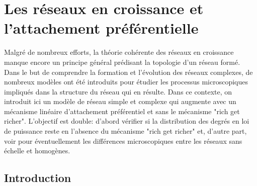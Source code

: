 \newcommand{\kms}{\textless k_s(t) \textgreater}
\newcommand{\kmss}{\textless k_s^2(t) \textgreater}

\chapter{Les réseaux en croissance et l'attachement préférentielle}

Malgré de nombreux efforts, la théorie cohérente des réseaux en croissance manque encore un principe général prédisant la topologie d'un réseau formé. Dans le but de comprendre la formation et l'évolution des réseaux complexes, de nombreux modèles ont été introduits pour étudier les processus microscopiques impliqués dans la structure du réseau qui en résulte. Dans ce contexte, on introduit ici un modèle de réseau simple et complexe qui augmente avec un mécanisme linéaire d'attachement préférentiel et sans le mécanisme "rich get richer".
L'objectif est double: d'abord vérifier si la distribution des degrés en loi de puissance reste en l'absence du mécanisme "rich get richer" et, d'autre part, voir pour éventuellement les différences microscopiques entre les réseaux sans échelle et homogènes. 

\section{Introduction}

